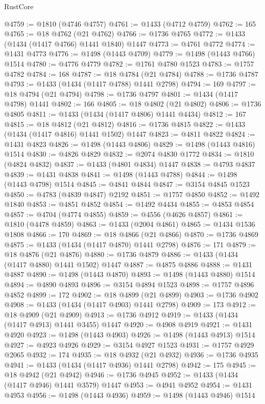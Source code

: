 \begin{lexlean}{RustCore}
\begin{coremodule}
@4759 := @1810 (@4746 @4757)
@4761 := @1433 (@4712 @4759)
@4762 := 165
@4765 := @18 @4762 (@21 @4762)
@4766 := @1736 @4765
@4772 := @1433 (@1434 (@1417 @4766) @1441 @1840) @1447
@4773 := @4761 @4772
@4774 := @1431 @4773
@4776 := @1498 (@1443 @4709)
@4779 := @1498 (@1443 @4766) @1514
@4780 := @4776 @4779
@4782 := @1761 @4780 @1523
@4783 := @1757 @4782
@4784 := 168
@4787 := @18 @4784 (@21 @4784)
@4788 := @1736 @4787
@4793 := @1433 (@1434 (@1417 @4788) @1441 @2798)
@4794 := 169
@4797 := @18 @4794 (@21 @4794)
@4798 := @1736 @4797
@4801 := @1434 (@1417 @4798) @1441
@4802 := 166
@4805 := @18 @4802 (@21 @4802)
@4806 := @1736 @4805
@4811 := @1433 (@1434 (@1417 @4806) @1441 @4434)
@4812 := 167
@4815 := @18 @4812 (@21 @4812)
@4816 := @1736 @4815
@4822 := @1433 (@1434 (@1417 @4816) @1441 @1502) @1447
@4823 := @4811 @4822
@4824 := @1431 @4823
@4826 := @1498 (@1443 @4806)
@4829 := @1498 (@1443 @4816) @1514
@4830 := @4826 @4829
@4832 := @2074 @4830 @1772
@4834 := @1810 (@4824 @4832)
@4837 := @1433 (@4801 @4834) @1447
@4838 := @4793 @4837
@4839 := @1431 @4838
@4841 := @1498 (@1443 @4788)
@4844 := @1498 (@1443 @4798) @1514
@4845 := @4841 @4844
@4847 := @3154 @4845 @1523
@4850 := @4783 (@4839 @4847) @2192
@4851 := @1757 @4850
@4852 := @1492 @1840
@4853 := @4851 @4852
@4854 := @1492 @4434
@4855 := @4853 @4854
@4857 := @4704 (@4774 @4855)
@4859 := @4556 (@4626 @4857)
@4861 := @1810 (@4478 @4859)
@4863 := @1433 (@2004 @4861)
@4865 := @1434 @1536 @1808
@4866 := 170
@4869 := @18 @4866 (@21 @4866)
@4870 := @1736 @4869
@4875 := @1433 (@1434 (@1417 @4870) @1441 @2798)
@4876 := 171
@4879 := @18 @4876 (@21 @4876)
@4880 := @1736 @4879
@4886 := @1433 (@1434 (@1417 @4880) @1441 @1502) @1447
@4887 := @4875 @4886
@4888 := @1431 @4887
@4890 := @1498 (@1443 @4870)
@4893 := @1498 (@1443 @4880) @1514
@4894 := @4890 @4893
@4896 := @3154 @4894 @1523
@4898 := @1757 @4896 @4852
@4899 := 172
@4902 := @18 @4899 (@21 @4899)
@4903 := @1736 @4902
@4908 := @1433 (@1434 (@1417 @4903) @1441 @2798)
@4909 := 173
@4912 := @18 @4909 (@21 @4909)
@4913 := @1736 @4912
@4919 := @1433 (@1434 (@1417 @4913) @1441 @3455) @1447
@4920 := @4908 @4919
@4921 := @1431 @4920
@4923 := @1498 (@1443 @4903)
@4926 := @1498 (@1443 @4913) @1514
@4927 := @4923 @4926
@4929 := @3154 @4927 @1523
@4931 := @1757 @4929 @2065
@4932 := 174
@4935 := @18 @4932 (@21 @4932)
@4936 := @1736 @4935
@4941 := @1433 (@1434 (@1417 @4936) @1441 @2798)
@4942 := 175
@4945 := @18 @4942 (@21 @4942)
@4946 := @1736 @4945
@4952 := @1433 (@1434 (@1417 @4946) @1441 @3579) @1447
@4953 := @4941 @4952
@4954 := @1431 @4953
@4956 := @1498 (@1443 @4936)
@4959 := @1498 (@1443 @4946) @1514

\end{coremodule}
\end{lexlean}
